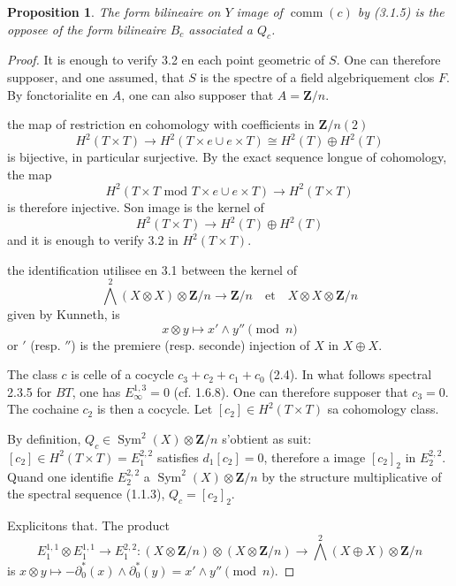 \documentclass[11pt,a4paper]{article}
\theoremstyle{plain}
\newtheorem{proposition}[theorem]{Proposition}
\theoremstyle{definition}
\DeclareMathOperator{\Sym}{Sym}
\DeclareMathOperator{\comm}{comm}
\begin{document}
\begin{proposition}\label{3.2}
The form bilineaire on $Y$ image of $\comm(c)$ by (3.1.5) is the opposee of the form bilineaire $B_c$ associated a $Q_c$.
\end{proposition}

\begin{proof}
It is enough to verify 3.2 en each point geometric of $S$. One can therefore supposer, and one assumed, that $S$ is the spectre of a field algebriquement clos $F$. By fonctorialite en $A$, one can also supposer that $A = \mathbf{Z}/n$.

the map of restriction en cohomology with coefficients in $\mathbf{Z}/n(2)$
\[
H^2(T \times T) \to H^2(T \times e \cup e \times T) \cong H^2(T) \oplus H^2(T)
\]
is bijective, in particular surjective. By the exact sequence longue of cohomology, the map
\[
H^2(T \times T \text{ mod } T \times e \cup e \times T) \to H^2(T \times T)
\]
is therefore injective. Son image is the kernel of
\begin{equation}\label{3.2.1}
H^2(T \times T) \to H^2(T) \oplus H^2(T)
\end{equation}
and it is enough to verify 3.2 in $H^2(T \times T)$.

the identification utilisee en 3.1 between the kernel of
\[
\bigwedge^2(X \otimes X) \otimes \mathbf{Z}/n \to \mathbf{Z}/n \quad \text{et} \quad X \otimes X \otimes \mathbf{Z}/n
\]
given by Kunneth, is
\[
x \otimes y \mapsto x' \wedge y'' \pmod{n}
\]
or $'$ (resp. $''$) is the premiere (resp. seconde) injection of $X$ in $X \oplus X$.

The class $c$ is celle of a cocycle $c_3 + c_2 + c_1 + c_0$ (2.4). In what follows spectral 2.3.5 for $BT$, one has $E_\infty^{1,3} = 0$ (cf. 1.6.8). One can therefore supposer that $c_3 = 0$. The cochaine $c_2$ is then a cocycle. Let $[c_2] \in H^2(T \times T)$ sa cohomology class.

By definition, $Q_c \in \Sym^2(X) \otimes \mathbf{Z}/n$ s'obtient as suit: $[c_2] \in H^2(T \times T) = E_1^{2,2}$ satisfies $d_1[c_2] = 0$, therefore a image $[c_2]_2$ in $E_2^{2,2}$. Quand one identifie $E_2^{2,2}$ a $\Sym^2(X) \otimes \mathbf{Z}/n$ by the structure multiplicative of the spectral sequence (1.1.3), $Q_c = [c_2]_2$.

Explicitons that. The product
\[
E_1^{1,1} \otimes E_1^{1,1} \to E_1^{2,2} : (X \otimes \mathbf{Z}/n) \otimes (X \otimes \mathbf{Z}/n) \to \bigwedge^2(X \oplus X) \otimes \mathbf{Z}/n
\]
is $x \otimes y \mapsto -\partial_0^*(x) \wedge \partial_0^*(y) = x' \wedge y'' \pmod{n}$.


\end{proof}
\end{document}
